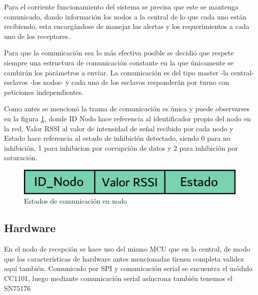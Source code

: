 Para el corriente funcionamiento del sistema se precisa que este se mantenga comunicado, dando información los nodos a la 
central de lo que cada uno están recibiendo, esta encargándose de manejar las alertas y los requerimientos a cada uno de los 
receptores. \par 
Para que la comunicación sea lo más efectiva posible se decidió que respete siempre una estructura de comunicación constante
en la que únicamente se cambirán los parámetros a enviar. La comunicación es del tipo master -la central- esclavos -los nodos-
y cada uno de los esclavos responderán por turno con peticiones independientes. \par
Como antes se mencionó la trama de comunicación es única y puede observarses en la figura \ref{comunicacion_nodo}, donde 
ID Nodo hace referencia al identificador propio del nodo en la red, Valor RSSI al valor de intensidad de señal recibido por cada
nodo y Estado hace referencia al estado de inhibición detectado, siendo 0 para no inhibición, 1 para inhibicion por corrupción
de datos y 2 para inhibición por saturación.

\begin{figure}
	\centering
	\includegraphics[scale=0.43]{images/nodos/comunicacion_nodo.png}
    \caption{Estados de comunicación en nodo}
	\label{comunicacion_nodo}
\end{figure}


\subsection{Hardware}

En el nodo de recepción se hace uso del mismo MCU que en la central, de modo que las características de hardware antes mencionadas
tienen completa validez aquí también. Comunicado por SPI y comunicación serial se encuentra el módulo CC1101, luego mediante
comunicación serial asíncrona también tenemos el SN75176  

